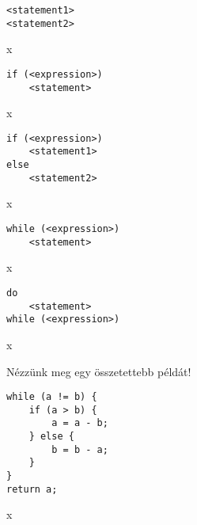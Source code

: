 \begin{minipage}{0.5\linewidth}
\begin{lstlisting}
<statement1>
<statement2>
\end{lstlisting}
\end{minipage}
\begin{minipage}{0.5\linewidth}
	x
\end{minipage}



\begin{minipage}{0.5\linewidth}
\begin{lstlisting}
if (<expression>)
	<statement>
\end{lstlisting}
\end{minipage}
\begin{minipage}{0.5\linewidth}
	x
\end{minipage}



\begin{minipage}{0.5\linewidth}
\begin{lstlisting}
if (<expression>)
	<statement1>
else
	<statement2>
\end{lstlisting}
\end{minipage}
\begin{minipage}{0.5\linewidth}
	x
\end{minipage}



\begin{minipage}{0.5\linewidth}
\begin{lstlisting}
while (<expression>)
	<statement>
\end{lstlisting}
\end{minipage}
\begin{minipage}{0.5\linewidth}
	x
\end{minipage}



\begin{minipage}{0.5\linewidth}
\begin{lstlisting}
do
	<statement>
while (<expression>)
\end{lstlisting}
\end{minipage}
\begin{minipage}{0.5\linewidth}
	x
\end{minipage}

Nézzünk meg egy összetettebb példát!

\begin{minipage}{0.5\linewidth}
\begin{lstlisting}
while (a != b) {
	if (a > b) {
		a = a - b;
	} else {
		b = b - a;
	}
}
return a;
\end{lstlisting}
\end{minipage}
\begin{minipage}{0.5\linewidth}
	x
\end{minipage}

